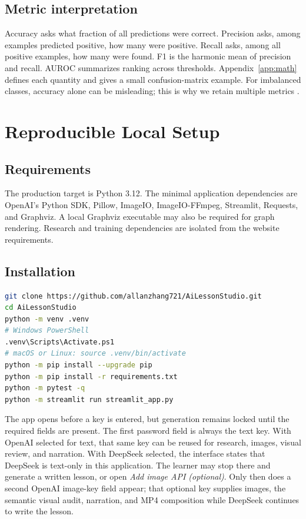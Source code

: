 \documentclass[11pt]{article}
\theoremstyle{plain}
\theoremstyle{definition}
\begin{document}
\subsection{Metric interpretation}

Accuracy asks what fraction of all predictions were correct. Precision asks, among examples predicted positive, how many were positive. Recall asks, among all positive examples, how many were found. F1 is the harmonic mean of precision and recall. AUROC summarizes ranking across thresholds. Appendix~\ref{app:math} defines each quantity and gives a small confusion-matrix example. For imbalanced classes, accuracy alone can be misleading; this is why we retain multiple metrics \citep{fawcett2006roc}.

\section{Reproducible Local Setup}

\subsection{Requirements}

The production target is Python 3.12. The minimal application dependencies are OpenAI's Python SDK, Pillow, ImageIO, ImageIO-FFmpeg, Streamlit, Requests, and Graphviz. A local Graphviz executable may also be required for graph rendering. Research and training dependencies are isolated from the website requirements.

\subsection{Installation}

\begin{lstlisting}[language=bash]
git clone https://github.com/allanzhang721/AiLessonStudio.git
cd AiLessonStudio
python -m venv .venv
# Windows PowerShell
.venv\Scripts\Activate.ps1
# macOS or Linux: source .venv/bin/activate
python -m pip install --upgrade pip
python -m pip install -r requirements.txt
python -m pytest -q
python -m streamlit run streamlit_app.py
\end{lstlisting}

The app opens before a key is entered, but generation remains locked until the required fields are present. The first password field is always the text key. With OpenAI selected for text, that same key can be reused for research, images, visual review, and narration. With DeepSeek selected, the interface states that DeepSeek is text-only in this application. The learner may stop there and generate a written lesson, or open \emph{Add image API (optional)}. Only then does a second OpenAI image-key field appear; that optional key supplies images, the semantic visual audit, narration, and MP4 composition while DeepSeek continues to write the lesson.
\end{document}
